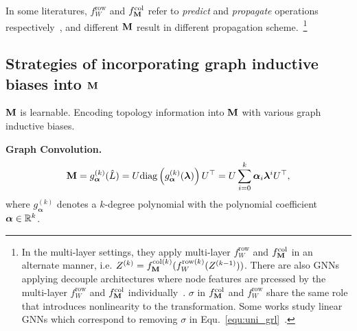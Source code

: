 \documentclass{article} %
\def\valpha{{\bm\alpha}}
\def\vlambda{{\bm\lambda}}
\begin{document}
In some literatures, $f_W^{\mathrm{row}}$ and $f_{{\mathbf{M}}}^{\mathrm{col}}$ refer to \emph{predict} and \emph{propagate} operations respectively~\citep{klicpera_predict_2019}, and different ${\mathbf{M}}$ result in different propagation scheme.~\footnote{
In the multi-layer settings, they apply multi-layer $f_W^{\mathrm{row}}$ and $f_{{\mathbf{M}}}^{\mathrm{col}}$ in an alternate manner, i.e. $Z^{(k)}=f_{{\mathbf{M}}}^{\mathrm{col}(k)}(f_W^{\mathrm{row}(k)}(Z^{(k-1)}))$.
There are also GNNs applying decouple architectures where node features are prcessed by the multi-layer $f_W^{\mathrm{row}}$ and $f_{{\mathbf{M}}}^{\mathrm{col}}$ individually~\citep{klicpera_predict_2019,pmlr-v97-wu19e,klicpera_predict_2019,liu2020towards,zhu2020simple,zhang2021litegem}.
$\sigma$ in $f_{{\mathbf{M}}}^{\mathrm{col}}$ and $f_W^{\mathrm{row}}$ share the same role that introduces nonlinearity to the transformation.
Some works study linear GNNs which correspond to removing $\sigma$ in Equ.~\ref{equ:uni_grl}~\citep{pmlr-v97-wu19e,xu2021optimization,JacobiConv,liu2021eignn,liu2022mgnni}.
}


\subsection{Strategies of incorporating graph inductive biases into ${\mathbf{M}}$}

${\mathbf{M}}$ is learnable.
Encoding topology information into ${\mathbf{M}}$ with various graph inductive biases.

\textbf{Graph Convolution.}
\begin{equation}
	\begin{aligned}
		\rmM=g_{\valpha}^{(k)}(\hat L)=U\mathrm{diag}\left(g_{\valpha}^{(k)}(\vlambda)\right)U^{\top}=U\sum_{i=0}^k\valpha_i\vlambda^iU^{\top},
	\end{aligned}
\end{equation}
where $g_{\valpha}^{(k)}$ denotes a $k$-degree polynomial with the polynomial coefficient $\valpha\in\sR^k$.
\end{document}
